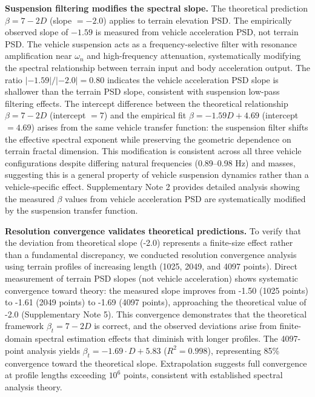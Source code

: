 \documentclass[11pt]{article}
\begin{document}
\textbf{Suspension filtering modifies the spectral slope.} The theoretical prediction $\beta = 7-2D$ (slope $= -2.0$) applies to terrain elevation PSD. The empirically observed slope of $-1.59$ is measured from vehicle acceleration PSD, not terrain PSD. The vehicle suspension acts as a frequency-selective filter with resonance amplification near $\omega_n$ and high-frequency attenuation, systematically modifying the spectral relationship between terrain input and body acceleration output. The ratio $|-1.59|/|-2.0| = 0.80$ indicates the vehicle acceleration PSD slope is shallower than the terrain PSD slope, consistent with suspension low-pass filtering effects. The intercept difference between the theoretical relationship $\beta = 7-2D$ (intercept $= 7$) and the empirical fit $\beta = -1.59D + 4.69$ (intercept $= 4.69$) arises from the same vehicle transfer function: the suspension filter shifts the effective spectral exponent while preserving the geometric dependence on terrain fractal dimension. This modification is consistent across all three vehicle configurations despite differing natural frequencies (0.89--0.98 Hz) and masses, suggesting this is a general property of vehicle suspension dynamics rather than a vehicle-specific effect. Supplementary Note 2 provides detailed analysis showing the measured $\beta$ values from vehicle acceleration PSD are systematically modified by the suspension transfer function.

\textbf{Resolution convergence validates theoretical predictions.} To verify that the deviation from theoretical slope (-2.0) represents a finite-size effect rather than a fundamental discrepancy, we conducted resolution convergence analysis using terrain profiles of increasing length (1025, 2049, and 4097 points). Direct measurement of terrain PSD slopes (not vehicle acceleration) shows systematic convergence toward theory: the measured slope improves from -1.50 (1025 points) to -1.61 (2049 points) to -1.69 (4097 points), approaching the theoretical value of -2.0 (Supplementary Note 5). This convergence demonstrates that the theoretical framework $\beta_t = 7-2D$ is correct, and the observed deviations arise from finite-domain spectral estimation effects that diminish with longer profiles. The 4097-point analysis yields $\beta_t = -1.69 \cdot D + 5.83$ ($R^2 = 0.998$), representing 85\% convergence toward the theoretical slope. Extrapolation suggests full convergence at profile lengths exceeding $10^6$ points, consistent with established spectral analysis theory\cite{Bendat2010}.
\end{document}
